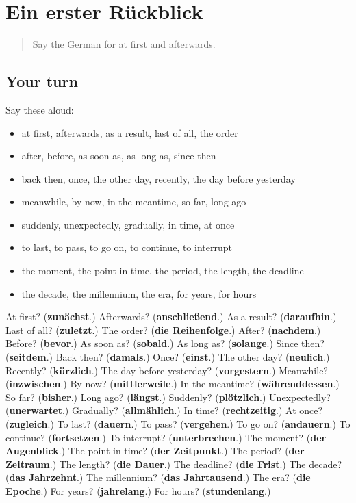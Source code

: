 \section[(dialogue)]{Ein erster Rückblick}

\label{lesson:GE-R269-review-262-269}



\begin{quote}
Say the German for at first and afterwards.
\end{quote}

\subsection*{Your turn}
Say these aloud:

\begin{itemize}
\raggedright
  \item at first, afterwards, as a result, last of all, the order
  \item after, before, as soon as, as long as, since then
  \item back then, once, the other day, recently, the day before yesterday
  \item meanwhile, by now, in the meantime, so far, long ago
  \item suddenly, unexpectedly, gradually, in time, at once
  \item to last, to pass, to go on, to continue, to interrupt
  \item the moment, the point in time, the period, the length, the deadline
  \item the decade, the millennium, the era, for years, for hours
\end{itemize}

\begin{tcolorbox}[breakable,colback=teal!4,colframe=teal!35!black,title={Before you move on}]
At first? (\textbf{zunächst}.) Afterwards? (\textbf{anschließend}.) As a result? (\textbf{daraufhin}.) Last of all? (\textbf{zuletzt}.) The order? (\textbf{die Reihenfolge}.) After? (\textbf{nachdem}.) Before? (\textbf{bevor}.) As soon as? (\textbf{sobald}.) As long as? (\textbf{solange}.) Since then? (\textbf{seitdem}.) Back then? (\textbf{damals}.) Once? (\textbf{einst}.) The other day? (\textbf{neulich}.) Recently? (\textbf{kürzlich}.) The day before yesterday? (\textbf{vorgestern}.) Meanwhile? (\textbf{inzwischen}.) By now? (\textbf{mittlerweile}.) In the meantime? (\textbf{währenddessen}.) So far? (\textbf{bisher}.) Long ago? (\textbf{längst}.) Suddenly? (\textbf{plötzlich}.) Unexpectedly? (\textbf{unerwartet}.) Gradually? (\textbf{allmählich}.) In time? (\textbf{rechtzeitig}.) At once? (\textbf{zugleich}.) To last? (\textbf{dauern}.) To pass? (\textbf{vergehen}.) To go on? (\textbf{andauern}.) To continue? (\textbf{fortsetzen}.) To interrupt? (\textbf{unterbrechen}.) The moment? (\textbf{der Augenblick}.) The point in time? (\textbf{der Zeitpunkt}.) The period? (\textbf{der Zeitraum}.) The length? (\textbf{die Dauer}.) The deadline? (\textbf{die Frist}.) The decade? (\textbf{das Jahrzehnt}.) The millennium? (\textbf{das Jahrtausend}.) The era? (\textbf{die Epoche}.) For years? (\textbf{jahrelang}.) For hours? (\textbf{stundenlang}.)
\end{tcolorbox}
